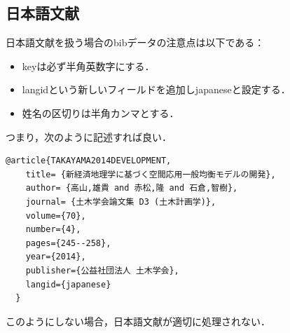 \documentclass[../main/main]{subfiles}
\begin{document}
\subsection{日本語文献}\label{subsec:japanese_bib}
日本語文献を扱う場合のbibデータの注意点は以下である：
\begin{itemize}
  \item keyは必ず半角英数字にする．
  \item langidという新しいフィールドを追加しjapaneseと設定する．
  \item 姓名の区切りは半角カンマとする．
\end{itemize}
つまり，次のように記述すれば良い．
\begin{framed}
  \begin{lstlisting}[language={[latex]TeX}]
    @article{TAKAYAMA2014DEVELOPMENT,
    title= {新経済地理学に基づく空間応用一般均衡モデルの開発},
    author= {高山,雄貴 and 赤松,隆 and 石倉,智樹},
    journal= {土木学会論文集 D3 (土木計画学)},
    volume={70},
    number={4},
    pages={245--258},
    year={2014},
    publisher={公益社団法人 土木学会},
    langid={japanese}
  }
  \end{lstlisting}
\end{framed}
このようにしない場合，日本語文献が適切に処理されない．
\end{document}
